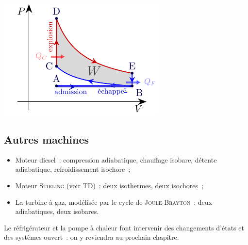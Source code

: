 \documentclass[../../main/main.tex]{subfiles}
\begin{document}
\begin{isd}
\begin{center}
	\end{center}
	\begin{center}
		\includegraphics[width=\linewidth]{PV_otto}
	\end{center}
\end{isd}

\subsection{Autres machines}
\begin{itemize}
	\item Moteur diesel~: compression adiabatique, chauffage isobare, détente
	      adiabatique, refroidissement isochore~;
	\item Moteur \textsc{Stirling} (voir TD)~: deux isothermes, deux
	      isochores~;
	\item La turbine à gaz, modélisée par le cycle de \textsc{Joule-Brayton}~:
	      deux adiabatiques, deux isobares.
\end{itemize}
Le réfrigérateur et la pompe à chaleur font intervenir des changements d'états
et des systèmes ouvert~: on y reviendra au prochain chapitre.
\end{document}
